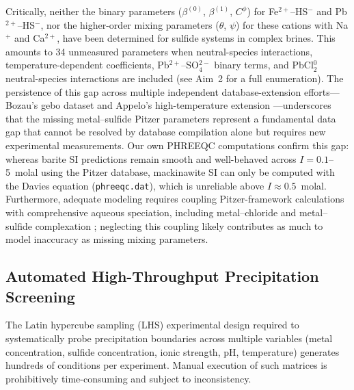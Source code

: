 \documentclass[12pt]{article}
\begin{document}
Critically, neither the binary parameters ($\beta^{(0)}$, $\beta^{(1)}$, $C^\phi$) for Fe$^{2+}$--HS$^-$ and Pb$^{2+}$--HS$^-$, nor the higher-order mixing parameters ($\theta$, $\psi$) for these cations with Na$^+$ and Ca$^{2+}$, have been determined for sulfide systems in complex brines. This amounts to 34 unmeasured parameters when neutral-species interactions, temperature-dependent coefficients, Pb$^{2+}$--SO$_4^{2-}$ binary terms, and PbCl$_2^0$ neutral-species interactions are included (see Aim~2 for a full enumeration). The persistence of this gap across multiple independent database-extension efforts---Bozau's gebo dataset \cite{bozau2013} and Appelo's high-temperature extension \cite{appelo2015}---underscores that the missing metal--sulfide Pitzer parameters represent a fundamental data gap that cannot be resolved by database compilation alone but requires new experimental measurements. Our own PHREEQC computations confirm this gap: whereas barite SI predictions remain smooth and well-behaved across $I = 0.1$--5~molal using the Pitzer database, mackinawite SI can only be computed with the Davies equation (\texttt{phreeqc.dat}), which is unreliable above $I \approx 0.5$~molal. Furthermore, adequate modeling requires coupling Pitzer-framework calculations with comprehensive aqueous speciation, including metal--chloride and metal--sulfide complexation \cite{kan2019,felmy2000}; neglecting this coupling likely contributes as much to model inaccuracy as missing mixing parameters.

\subsection{Automated High-Throughput Precipitation Screening}

The Latin hypercube sampling (LHS) experimental design required to systematically probe precipitation boundaries across multiple variables (metal concentration, sulfide concentration, ionic strength, pH, temperature) generates hundreds of conditions per experiment. Manual execution of such matrices is prohibitively time-consuming and subject to inconsistency.
\end{document}
